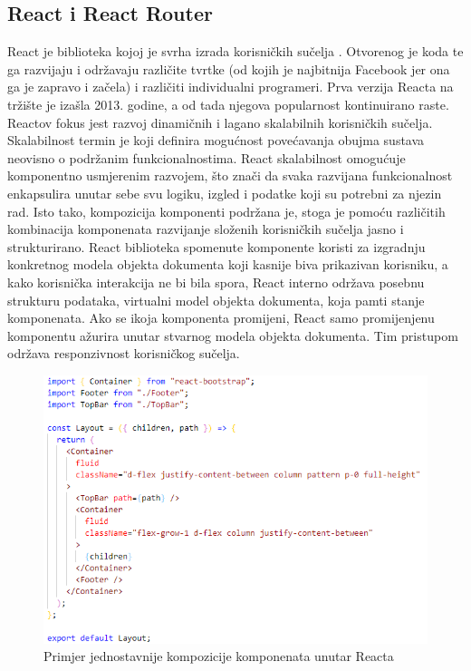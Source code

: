\documentclass[times, utf8, zavrsni]{fer}
\begin{document}
			\subsection{React i React Router}
			React je biblioteka kojoj je svrha izrada korisničkih sučelja . Otvorenog je koda te ga razvijaju i održavaju različite tvrtke (od kojih je najbitnija Facebook jer ona ga je zapravo i začela) i različiti individualni programeri. Prva verzija Reacta na tržište je izašla 2013. godine, a od tada njegova popularnost kontinuirano raste. Reactov fokus jest razvoj dinamičnih i lagano skalabilnih korisničkih sučelja. Skalabilnost  termin je koji definira mogućnost povećavanja obujma sustava neovisno o podržanim funkcionalnostima. React skalabilnost omogućuje komponentno usmjerenim razvojem, što znači da svaka razvijana funkcionalnost enkapsulira unutar sebe svu logiku, izgled i podatke koji su potrebni za njezin rad. Isto tako, kompozicija komponenti podržana je, stoga je pomoću različitih kombinacija komponenata razvijanje složenih korisničkih sučelja jasno i strukturirano. React biblioteka spomenute komponente koristi za izgradnju konkretnog modela objekta dokumenta  koji kasnije biva prikazivan korisniku, a kako korisnička interakcija ne bi bila spora, React interno održava posebnu strukturu podataka, virtualni model objekta dokumenta, koja pamti stanje komponenata. Ako se ikoja komponenta promijeni, React samo promijenjenu komponentu ažurira unutar stvarnog modela objekta dokumenta. Tim pristupom održava responzivnost korisničkog sučelja.\\
			\begin{figure}[H]
				\centering
				\includegraphics[scale=0.75]{pictures/prikazi/React.png}
				\caption{Primjer jednostavnije kompozicije komponenata unutar Reacta}
				\label{fig:react}
			\end{figure}
\end{document}
